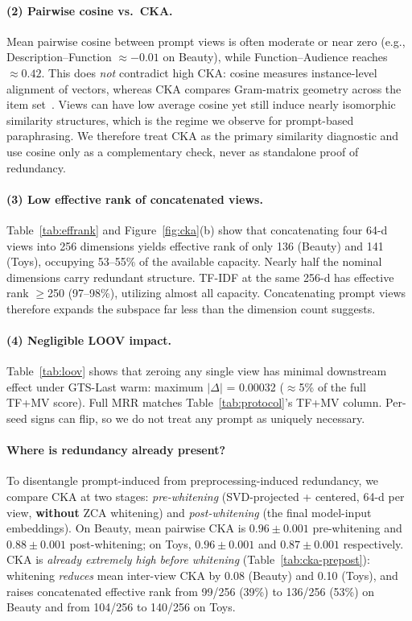 \documentclass[sigconf,natbib=true,anonymous]{acmart}
\newcommand{\tfmv}{\textsc{TF+MV}\xspace}
\begin{document}
\paragraph{(2) Pairwise cosine vs.\ CKA.}
Mean pairwise cosine between prompt views is often moderate or near zero (e.g., Description--Function $\approx -0.01$ on Beauty), while Function--Audience reaches $\approx 0.42$.
This does \emph{not} contradict high CKA: cosine measures instance-level alignment of vectors, whereas CKA compares Gram-matrix geometry across the item set~\cite{kornblith2019cka}.
Views can have low average cosine yet still induce nearly isomorphic similarity structures, which is the regime we observe for prompt-based paraphrasing.
We therefore treat CKA as the primary similarity diagnostic and use cosine only as a complementary check, never as standalone proof of redundancy.

\paragraph{(3) Low effective rank of concatenated views.}
Table~\ref{tab:effrank} and Figure~\ref{fig:cka}(b) show that concatenating four 64-d views into 256 dimensions yields effective rank of only 136 (Beauty) and 141 (Toys), occupying 53--55\% of the available capacity.
Nearly half the nominal dimensions carry redundant structure.
TF-IDF at the same 256-d has effective rank $\ge$250 (97--98\%), utilizing almost all capacity.
Concatenating prompt views therefore expands the subspace far less than the dimension count suggests.

\paragraph{(4) Negligible LOOV impact.}
Table~\ref{tab:loov} shows that zeroing any single view has minimal downstream effect under GTS-Last warm: maximum $|\Delta|$ = 0.00032 ($\approx$5\% of the full \tfmv score).
Full MRR matches Table~\ref{tab:protocol}'s \tfmv column.
Per-seed signs can flip, so we do not treat any prompt as uniquely necessary.

\paragraph{Where is redundancy already present?}
To disentangle prompt-induced from preprocessing-induced redundancy, we compare CKA at two stages: \emph{pre-whitening} (SVD-projected + centered, 64-d per view, \textbf{without} ZCA whitening) and \emph{post-whitening} (the final model-input embeddings).
On Beauty, mean pairwise CKA is $0.96\pm0.001$ pre-whitening and $0.88\pm0.001$ post-whitening; on Toys, $0.96\pm0.001$ and $0.87\pm0.001$ respectively.
CKA is \emph{already extremely high before whitening} (Table~\ref{tab:cka-prepost}): whitening \emph{reduces} mean inter-view CKA by 0.08 (Beauty) and 0.10 (Toys), and raises concatenated effective rank from 99/256 (39\%) to 136/256 (53\%) on Beauty and from 104/256 to 140/256 on Toys.
\end{document}
